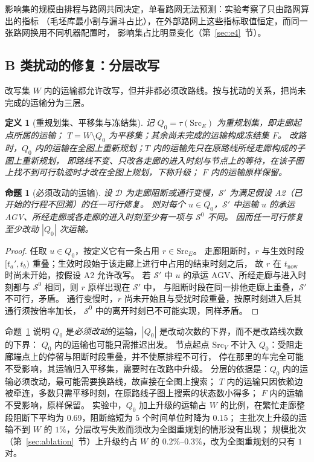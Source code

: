 \documentclass[manuscript,screen,review]{acmart}
\newcommand{\TierReplanShare}{0.69}      %
\newtheorem{definition}{定义}
\newtheorem{prop}{命题}
\begin{document}
影响集的规模由排程与路网共同决定，单看路网无法预测：实验考察了只由路网算出的指标
（毛坯库最小割与漏斗占比），在外部路网上这些指标取值恒定，而同一张路网换用不同机器配置时，
影响集占比明显变化（第~\ref{sec:e4}~节）。

\subsection{B 类扰动的修复：分层改写}
\label{sec:level1}

改写集 \(W\) 内的运输都允许改写，但并非都必须改路线。按与扰动的关系，把尚未完成的运输分为三层。

\begin{definition}[重规划集、平移集与冻结集]
\label{def:tiers}
记 \(Q_0=\tau(\mathrm{Src}_E)\) 为\emph{重规划集}，即走廊起点所属的运输；
\(T=W\setminus Q_0\) 为\emph{平移集}；其余尚未完成的运输构成\emph{冻结集} \(F\)。
改路时，\(Q_0\) 内的运输在全图上重新规划；\(T\) 内的运输先只在原路线所经走廊构成的子图上重新规划，
即路线不变、只改各走廊的进入时刻与节点上的等待，在该子图上找不到可行轨迹时才改在全图上规划，下称\emph{升级}；
\(F\) 内的运输原样保留。
\end{definition}

\begin{prop}[必须改动的运输]
\label{prop:must}
设 \(\mathcal{D}\) 为走廊阻断或通行变慢，\(\mathcal{S}'\) 为满足假设 A2（已开始的行程不回溯）的任一可行修复。
则对每个 \(u\in Q_0\)，\(\mathcal{S}'\) 中运输 \(u\) 的承运 AGV、所经走廊或各走廊的进入时刻至少有一项与 \(\mathcal{S}^0\) 不同。
因而任一可行修复至少改动 \(|Q_0|\) 次运输。
\end{prop}

\begin{proof}
任取 \(u\in Q_0\)，按定义它有一条占用 \(r\in\mathrm{Src}_E\)。
走廊阻断时，\(r\) 与生效时段 \([t_a',t_b)\) 重叠；生效时段始于该走廊上进行中占用的结束时刻之后，
故 \(r\) 在 \(t_{\mathrm{now}}\) 时尚未开始，按假设 A2 允许改写。
若 \(\mathcal{S}'\) 中 \(u\) 的承运 AGV、所经走廊与进入时刻都与 \(\mathcal{S}^0\) 相同，则 \(r\) 原样出现在 \(\mathcal{S}'\) 中，
与阻断时段在同一排他走廊上重叠，\(\mathcal{S}'\) 不可行，矛盾。
通行变慢时，\(r\) 尚未开始且与受扰时段重叠，按原时刻进入后其通行须按倍率加长，
\(\mathcal{S}^0\) 中的离开时刻已不可能实现，同样矛盾。
\end{proof}

命题~\ref{prop:must} 说明 \(Q_0\) 是\emph{必须改动}的运输，\(|Q_0|\) 是改动次数的下界，而不是改路线次数的下界：
\(Q_0\) 内的运输也可能只需推迟出发。
节点起点 \(\mathrm{Src}_V\) 不计入 \(Q_0\)：受阻走廊端点上的停留与阻断时段重叠，并不使原排程不可行，
停在那里的车完全可能不受影响，其运输归入平移集，需要时在改路中升级。
分层的依据是：\(Q_0\) 内的运输必须改动，最可能需要换路线，故直接在全图上搜索；
\(T\) 内的运输只因依赖边被牵连，多数只需平移时刻，在原路线子图上搜索的状态数小得多；
\(F\) 内的运输不受影响，原样保留。
实验中，\(Q_0\) 加上升级的运输占 \(W\) 的比例，在繁忙走廊整段阻断下平均为 \TierReplanShare，阻断缩短为 \(5\) 个时间单位时降为 \(0.15\)；
主批次上升级的运输不到 \(W\) 的 \(1\%\)，分层改写失败而须改为全图重规划的情形没有出现；
规模批次（第~\ref{sec:ablation}~节）上升级约占 \(W\) 的 \(0.2\%\)--\(0.3\%\)，改为全图重规划的只有 \(1\) 对。
\end{document}
